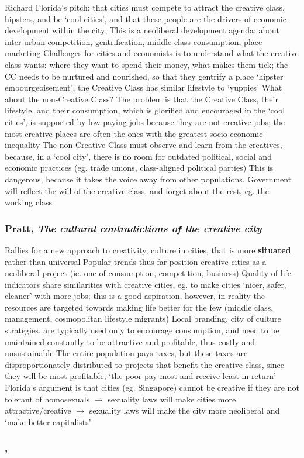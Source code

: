 \documentclass{article}
\begin{document}
\begin{outline}
	\1 Richard Florida's pitch: that cities must compete to attract the creative class, hipsters, and be `cool cities', and that these people are the drivers of economic development within the city; 
		\2 This is a neoliberal development agenda: about inter-urban competition, gentrification, middle-class consumption, place marketing
	\1 Challenges for cities and economists is to understand what the creative class wants: where they want to spend their money, what makes them tick; the CC needs to be nurtured and nourished, so that they gentrify a place 
	\1 `hipster embourgeoisement', the Creative Class has similar lifestyle to `yuppies'
	\1 What about the non-Creative Class?
		\2 The problem is that the Creative Class, their lifestyle, and their consumption, which is glorified and encouraged in the `cool cities', is supported by low-paying jobs because they are not creative jobs; the most creative places are often the ones with the greatest socio-economic inequality
		\2 The non-Creative Class must observe and learn from the creatives, because, in a `cool city', there is no room for outdated political, social and economic practices (eg. trade unions, class-aligned political parties)
		\2 This is dangerous, because it takes the voice away from other populations. Government will reflect the will of the creative class, and forget about the rest, eg. the working class
\end{outline}

\subsubsection{Pratt, \textit{The cultural contradictions of the creative city}}

\begin{outline}
	\1 Rallies for a new approach to creativity, culture in cities, that is more \textbf{situated} rather than universal
	\1 Popular trends thus far position creative cities as a neoliberal project (ie. one of consumption, competition, business)
	\1 Quality of life indicators share similarities with creative cities, eg. to make cities `nicer, safer, cleaner' with more jobs; this is a good aspiration, however, in reality the resources are targeted towards making life better for the few (middle class, management, cosmopolitan lifestyle migrants)
	\1 Local branding, city of culture strategies, are typically used only to encourage consumption, and need to be maintained constantly to be attractive and profitable, thus costly and unsustainable 
	\1 The entire population pays taxes, but these taxes are disproportionately distributed to projects that benefit the creative class, since they will be most profitable; `the poor pay most and receive least in return'
	\1 Florida's argument is that cities (eg. Singapore) cannot be creative if they are not tolerant of homosexuals $\rightarrow$ sexuality laws will make cities more attractive/creative $\rightarrow$ sexuality laws will make the city more neoliberal and `make better capitalists'
	\1
\end{outline}



\subsubsection{, \textit{}}

\begin{outline}
	\1
\end{outline}
\end{document}
